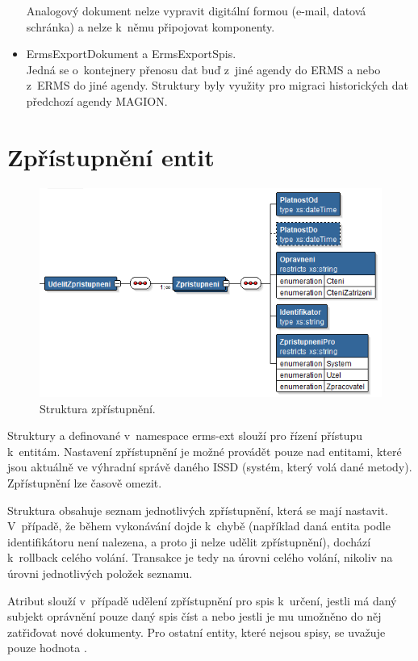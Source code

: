 \documentclass[
  master,
  field=ainfp,
  biblatex,
  language=czech,
  glossaries,
  theorems=false,
  index
]{kidiplom}
\begin{document}
\begin{itemize}
Analogový dokument nelze vypravit digitální formou (e-mail, datová schránka) a nelze k~němu připojovat komponenty.
	 \item ErmsExportDokument a ErmsExportSpis.\\
	 Jedná se o~kontejnery přenosu dat buď z~jiné agendy do ERMS a nebo z~ERMS do jiné agendy. Struktury byly využity pro migraci historických dat předchozí agendy MAGION.
\end{itemize}


\newpage
\section{Zpřístupnění entit}
\begin{figure}[h]
  \centerline{\includegraphics[width=0.9\linewidth]{./images/UdelitZpristupneni.png}} 
  \caption{Struktura zpřístupnění.} 
\end{figure}
Struktury  a  definované v~namespace erms-ext slouží pro řízení přístupu k~entitám. Nastavení zpřístupnění je možné provádět pouze nad entitami, které jsou aktuálně ve výhradní správě daného ISSD (systém, který volá dané metody). Zpřístupnění lze časově omezit.

Struktura  obsahuje seznam jednotlivých zpřístupnění, která se mají nastavit. V~případě, že během vykonávání dojde k~chybě (například daná entita podle identifikátoru není nalezena, a proto ji nelze udělit zpřístupnění), dochází k~rollback celého volání. Transakce je tedy na úrovni celého volání, nikoliv na úrovni jednotlivých položek seznamu.

Atribut  slouží v~případě udělení zpřístupnění pro spis k~určení, jestli má daný subjekt oprávnění pouze daný spis číst a nebo jestli je mu umožněno do něj zatřiďovat nové dokumenty. Pro ostatní entity, které nejsou spisy, se uvažuje pouze hodnota .
\end{document}
